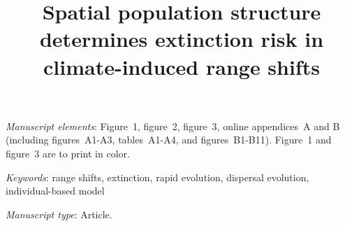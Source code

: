 \documentclass[11pt]{article}
\title{Spatial population structure determines extinction risk in climate-induced range shifts}
\date{}
\begin{document}
\maketitle






\bigskip

\textit{Manuscript elements}: Figure~1, figure~2, figure~3, online appendices~A and B (including figures~A1-A3,  tables~A1-A4, and figures~B1-B11). Figure~1 and figure~3 are to print in color.

\bigskip

\textit{Keywords}: range shifts, extinction, rapid evolution, dispersal evolution, individual-based model

\bigskip

\textit{Manuscript type}: Article. %

\bigskip


\linenumbers{}
\modulolinenumbers[3]

\newpage{}
\end{document}
